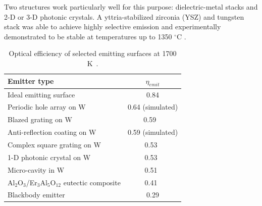 \documentclass[review]{elsarticle}
\begin{document}
Two structures work particularly well for this purpose: dielectric-metal stacks and 2-D or 3-D photonic crystals.  A yttria-stabilized zirconia (YSZ) and tungsten stack was able to achieve highly selective emission and experimentally demonstrated to be stable at temperatures up to 1350 $^\circ$C \cite{SKY_JPE_2015}.

\begin{table}
	\caption{Optical efficiency of selected emitting surfaces at 1700 K~\cite{me_thesis}.}
	\label{FOM_table}
	\begin{center}
		\begin{tabular}{|lc|}
			\hline
			Emitter type & $\eta_{emit}$\\
			\hline	
			Ideal emitting surface & 0.84 \\
			Periodic hole array on W & 0.64 (simulated)\\
			Blazed grating on W & 0.59 ~\cite{me2} \\
			Anti-reflection coating on W & 0.59 (simulated) \\
			Complex square grating on W & 0.53~\cite{paper2_ref14}\\
			1-D photonic crystal on W & 0.53~\cite{SKY_JPE_2015}\\
			Micro-cavity in W & 0.51~\cite{paper2_ref6} \\
			{A}l$_2${O}$_3$/{E}r$_3${A}l$_5${O}$_{12}$ eutectic composite & 0.41~\cite{exp_tokyo}\\
			Blackbody emitter & 0.29\\
			\hline
		\end{tabular}
	\end{center}
\end{table}
\end{document}
